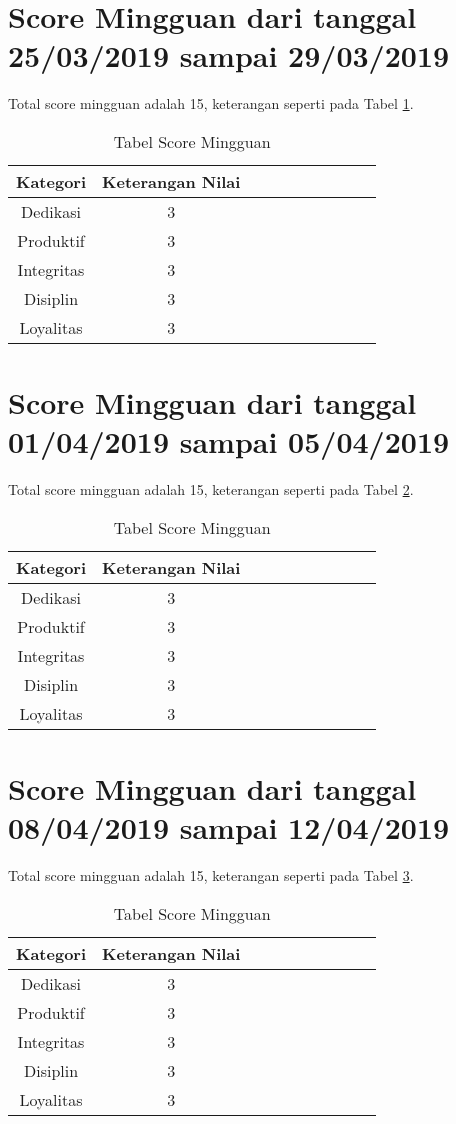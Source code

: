 \section{Score Mingguan dari tanggal 25/03/2019 sampai 29/03/2019}
Total score mingguan adalah 15,  keterangan seperti pada Tabel \ref{table:scoremingguan5}.
\begin{table}[!ht]
\centering
\begin{tabular}{ |c|c|c|c|c|c|c|c|c|c| }
\hline
Kategori & Keterangan Nilai \\
\hline
Dedikasi & 3 \\
\hline
Produktif & 3 \\
\hline
Integritas & 3 \\
\hline
Disiplin & 3 \\
\hline
Loyalitas & 3 \\
\hline
\end{tabular}
\caption{Tabel Score Mingguan}
\label{table:scoremingguan5}
\end{table}



\section{Score Mingguan dari tanggal 01/04/2019 sampai 05/04/2019}
Total score mingguan adalah 15,  keterangan seperti pada Tabel \ref{table:scoremingguan6}.
\begin{table}[!ht]
\centering
\begin{tabular}{ |c|c|c|c|c|c|c|c|c|c| }
\hline
Kategori & Keterangan Nilai \\
\hline
Dedikasi & 3 \\
\hline
Produktif & 3 \\
\hline
Integritas & 3 \\
\hline
Disiplin & 3 \\
\hline
Loyalitas & 3 \\
\hline
\end{tabular}
\caption{Tabel Score Mingguan}
\label{table:scoremingguan6}
\end{table}


\section{Score Mingguan dari tanggal 08/04/2019 sampai 12/04/2019}
Total score mingguan adalah 15,  keterangan seperti pada Tabel \ref{table:scoremingguan7}.
\begin{table}[!ht]
\centering
\begin{tabular}{ |c|c|c|c|c|c|c|c|c|c| }
\hline
Kategori & Keterangan Nilai \\
\hline
Dedikasi & 3 \\
\hline
Produktif & 3 \\
\hline
Integritas & 3 \\
\hline
Disiplin & 3 \\
\hline
Loyalitas & 3 \\
\hline
\end{tabular}
\caption{Tabel Score Mingguan}
\label{table:scoremingguan7}
\end{table}


